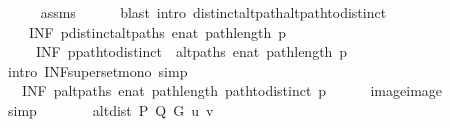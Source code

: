 \begin{isabellebody}
\ \ \ \ \isamarkupfalse%
\ assms\isanewline
\ \ \ \ \isamarkupfalse%
\ {\isacharparenleft}{\kern0pt}blast\ intro{\isacharcolon}{\kern0pt}\ distinct{\isacharunderscore}{\kern0pt}alt{\isacharunderscore}{\kern0pt}path{\isacharunderscore}{\kern0pt}alt{\isacharunderscore}{\kern0pt}path{\isacharunderscore}{\kern0pt}to{\isacharunderscore}{\kern0pt}distinct{\isacharparenright}{\kern0pt}\isanewline
\ \ \isamarkupfalse%
\isanewline
\ \ \ \ {\isachardoublequoteopen}{\isacharparenleft}{\kern0pt}INF\ p{\isasymin}{\isacharquery}{\kern0pt}distinct{\isacharunderscore}{\kern0pt}alt{\isacharunderscore}{\kern0pt}paths{\isachardot}{\kern0pt}\ enat\ {\isacharparenleft}{\kern0pt}path{\isacharunderscore}{\kern0pt}length\ p{\isacharparenright}{\kern0pt}{\isacharparenright}{\kern0pt}\ {\isasymle}\isanewline
\ \ \ \ \ {\isacharparenleft}{\kern0pt}INF\ p{\isasymin}path{\isacharunderscore}{\kern0pt}to{\isacharunderscore}{\kern0pt}distinct\ {\isacharbackquote}{\kern0pt}\ {\isacharquery}{\kern0pt}alt{\isacharunderscore}{\kern0pt}paths{\isachardot}{\kern0pt}\ enat\ {\isacharparenleft}{\kern0pt}path{\isacharunderscore}{\kern0pt}length\ p{\isacharparenright}{\kern0pt}{\isacharparenright}{\kern0pt}{\isachardoublequoteclose}\isanewline
\ \ \ \ \isamarkupfalse%
\ {\isacharparenleft}{\kern0pt}intro\ INF{\isacharunderscore}{\kern0pt}superset{\isacharunderscore}{\kern0pt}mono{\isacharparenright}{\kern0pt}\ simp{\isacharplus}{\kern0pt}\isanewline
\ \ \isamarkupfalse%
\ \isamarkupfalse%
\ {\isachardoublequoteopen}{\isachardot}{\kern0pt}{\isachardot}{\kern0pt}{\isachardot}{\kern0pt}\ {\isacharequal}{\kern0pt}\ {\isacharparenleft}{\kern0pt}INF\ p{\isasymin}{\isacharquery}{\kern0pt}alt{\isacharunderscore}{\kern0pt}paths{\isachardot}{\kern0pt}\ enat\ {\isacharparenleft}{\kern0pt}path{\isacharunderscore}{\kern0pt}length\ {\isacharparenleft}{\kern0pt}path{\isacharunderscore}{\kern0pt}to{\isacharunderscore}{\kern0pt}distinct\ p{\isacharparenright}{\kern0pt}{\isacharparenright}{\kern0pt}{\isacharparenright}{\kern0pt}{\isachardoublequoteclose}\isanewline
\ \ \ \ \isamarkupfalse%
\ image{\isacharunderscore}{\kern0pt}image\isanewline
\ \ \ \ \isamarkupfalse%
\ simp\isanewline
\ \ \isamarkupfalse%
\ \isamarkupfalse%
\ {\isachardoublequoteopen}{\isachardot}{\kern0pt}{\isachardot}{\kern0pt}{\isachardot}{\kern0pt}\ {\isasymle}\ alt{\isacharunderscore}{\kern0pt}dist\ P\ Q\ G\ u\ v{\isachardoublequoteclose}\isanewline
\ \ \ \ \isamarkupfalse%

\end{isabellebody}
